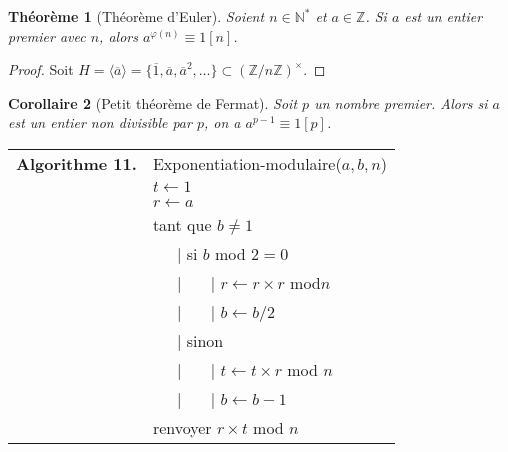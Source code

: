 \documentclass[12pt]{report}
\newtheorem{thm}{Théorème}[chapter]
\newtheorem{corollaire}[thm]{Corollaire}
\newcommand{\Z}{\mathbb{Z}}
\begin{document}
\begin{thm}[Théorème d'Euler]
Soient $n \in \mathbb{N}^*$ et $a\in \Z$. Si $a$ est un entier premier avec $n$, alors $a^{\varphi(n)}\equiv 1 [n]$.
\end{thm}

\begin{proof}
Soit $H=\langle \overline{a}\rangle=\{\overline{1},\overline{a},\overline{a}^2,\ldots \} \subset (\Z/n\Z)^\times$.
\end{proof}

\begin{corollaire}[Petit théorème de Fermat] Soit $p$ un nombre premier. Alors si $a$ est un entier non divisible par $p$, on a $a^{p-1}\equiv 1 [p]$.
\end{corollaire}




\begin{tabular}{ll}
\textbf{Algorithme 11.} & Exponentiation-modulaire($a,b,n$)\\
           & $t \leftarrow 1 $ \\
           & $ r \leftarrow a$ \\
           &  tant que $b  \neq 1$   \\
           & \ \ \ {\rm |} si $b$ mod $2=0$\\
           & \ \ \ {\rm |} \ \ \ {\rm |} $r \leftarrow r \times r$ mod$n$ \\
           & \ \ \ {\rm |} \ \ \ {\rm |} $ b\leftarrow b/2$ \\
           & \ \ \ {\rm |} sinon  \\
           & \ \ \ {\rm |} \ \ \ {\rm |} $t \leftarrow t \times r$ mod $n$\\
           & \ \ \ {\rm |} \ \ \ {\rm |} $b \leftarrow b-1$\\         
           & renvoyer $r \times t$ mod $n$  
\end{tabular}\\
\end{document}
